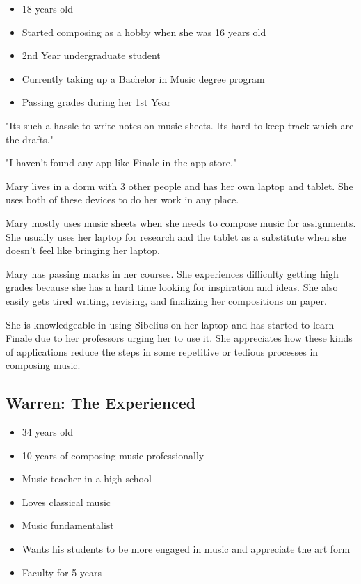 \begin{itemize}
\item 18 years old
\item Started composing as a hobby when she was 16 years old
\item 2nd Year undergraduate student
\item Currently taking up a Bachelor in Music degree program
\item Passing grades during her 1st Year
\end{itemize}

"Its such a hassle to write notes on music sheets. Its hard to keep track which are the drafts."

"I haven't found any app like Finale in the app store."

Mary lives in a dorm with 3 other people and has her own laptop and tablet. She uses both of these devices to do her work in any place.

Mary mostly uses music sheets when she needs to compose music for assignments. She usually uses her laptop for research and the tablet as a substitute when she doesn't feel like bringing her laptop.

Mary has passing marks in her courses. She experiences difficulty getting high grades because she has a hard time looking for inspiration and ideas. She also easily gets tired writing, revising, and finalizing her compositions on paper.

She is knowledgeable in using Sibelius on her laptop and has started to learn Finale due to her professors urging her to use it. She appreciates how these kinds of applications reduce the steps in some repetitive or tedious processes in composing music.

\begin{comment}
\begin{wrapfigure}{l}{0.5\textwidth}
  \begin{center}
  
    \texttt{[image: warren\_persona]}
  \end{center}
\end{wrapfigure}
\end{comment}

\subsection{Warren: The Experienced}

\begin{itemize}
\item 34 years old
\item 10 years of composing music professionally
\item Music teacher in a high school
\item Loves classical music
\item Music fundamentalist
\item Wants his students to be more engaged in music and appreciate the art form
\item Faculty for 5 years
\end{itemize}

